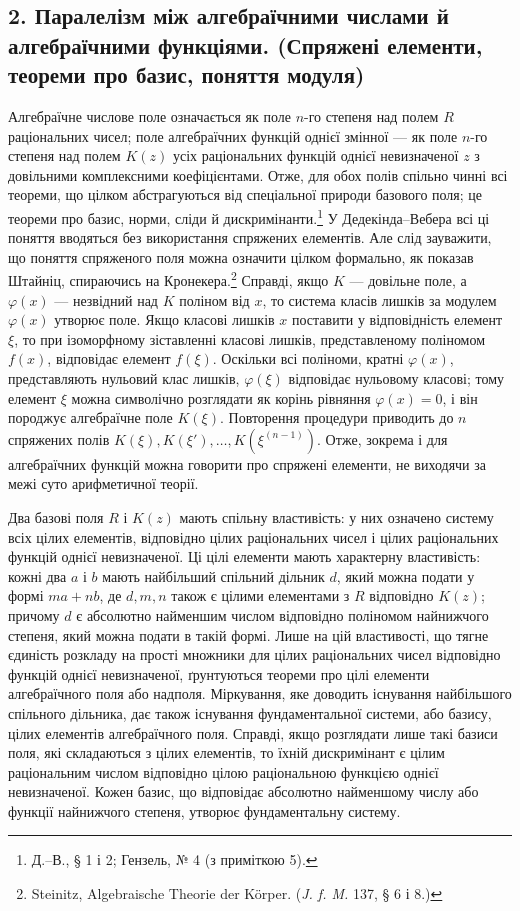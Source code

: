 \documentclass[11pt]{article}
\begin{document}
\subsection*{2. Паралелізм між алгебраїчними числами й алгебраїчними функціями. (Спряжені елементи, теореми про базис, поняття модуля)}
Алгебраїчне числове поле означається як поле \(n\)-го степеня над полем \(R\) раціональних чисел; поле алгебраїчних функцій однієї змінної --- як поле \(n\)-го степеня над полем \(K(z)\) усіх раціональних функцій однієї невизначеної \(z\) з довільними комплексними коефіцієнтами. Отже, для обох полів спільно чинні всі теореми, що цілком абстрагуються від спеціальної природи базового поля; це теореми про базис, норми, сліди й дискримінанти.\footnote{Д.--В., § 1 і 2; Гензель, № 4 (з приміткою 5).} У Дедекінда--Вебера всі ці поняття вводяться без використання спряжених елементів. Але слід зауважити, що поняття спряженого поля можна означити цілком формально, як показав Штайніц, спираючись на Кронекера.\footnote{Steinitz, Algebraische Theorie der Körper. (\emph{J. f. M.} 137, § 6 і 8.)} Справді, якщо \(K\) --- довільне поле, а \(\varphi(x)\) --- незвідний над \(K\) поліном від \(x\), то система класів лишків за модулем \(\varphi(x)\) утворює поле. Якщо класові лишків \(x\) поставити у відповідність елемент \(\xi\), то при ізоморфному зіставленні класові лишків, представленому поліномом \(f(x)\), відповідає елемент \(f(\xi)\). Оскільки всі поліноми, кратні \(\varphi(x)\), представляють нульовий клас лишків, \(\varphi(\xi)\) відповідає нульовому класові; тому елемент \(\xi\) можна символічно розглядати як корінь рівняння \(\varphi(x)=0\), і він породжує алгебраїчне поле \(K(\xi)\). Повторення процедури приводить до \(n\) спряжених полів \(K(\xi), K(\xi'),\ldots,K(\xi^{(n-1)})\). Отже, зокрема і для алгебраїчних функцій можна говорити про спряжені елементи, не виходячи за межі суто арифметичної теорії.

Два базові поля \(R\) і \(K(z)\) мають спільну властивість: у них означено систему всіх цілих елементів, відповідно цілих раціональних чисел і цілих раціональних функцій однієї невизначеної. Ці цілі елементи мають характерну властивість: кожні два \(a\) і \(b\) мають найбільший спільний дільник \(d\), який можна подати у формі \(ma+nb\), де \(d,m,n\) також є цілими елементами з \(R\) відповідно \(K(z)\); причому \(d\) є абсолютно найменшим числом відповідно поліномом найнижчого степеня, який можна подати в такій формі. Лише на цій властивості, що тягне єдиність розкладу на прості множники для цілих раціональних чисел відповідно функцій однієї невизначеної, ґрунтуються теореми про цілі елементи алгебраїчного поля або надполя. Міркування, яке доводить існування найбільшого спільного дільника, дає також існування фундаментальної системи, або базису, цілих елементів алгебраїчного поля. Справді, якщо розглядати лише такі базиси поля, які складаються з цілих елементів, то їхній дискримінант є цілим раціональним числом відповідно цілою раціональною функцією однієї невизначеної. Кожен базис, що відповідає абсолютно найменшому числу або функції найнижчого степеня, утворює фундаментальну систему.
\end{document}
